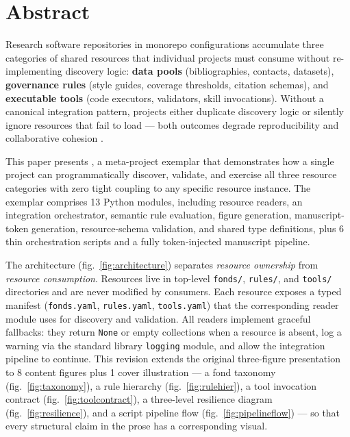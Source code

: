 \documentclass[
]{article}
\begin{document}
\newpage

\section{Abstract}\label{abstract}

Research software repositories in monorepo configurations accumulate
three categories of shared resources that individual projects must
consume without re-implementing discovery logic: \textbf{data pools}
(bibliographies, contacts, datasets), \textbf{governance rules} (style
guides, coverage thresholds, citation schemas), and \textbf{executable
tools} (code executors, validators, skill invocations). Without a
canonical integration pattern, projects either duplicate discovery logic
or silently ignore resources that fail to load --- both outcomes degrade
reproducibility and collaborative cohesion
\citep{Wilson2014best, Taschuk2017ten}.

This paper presents , a
meta-project exemplar that demonstrates how a single project can
programmatically discover, validate, and exercise all three resource
categories with zero tight coupling to any specific resource instance.
The exemplar comprises 13 Python modules, including resource readers, an
integration orchestrator, semantic rule evaluation, figure generation,
manuscript-token generation, resource-schema validation, and shared type
definitions, plus 6 thin orchestration scripts and a fully
token-injected manuscript pipeline.

The architecture (fig.~\ref{fig:architecture}) separates \emph{resource
ownership} from \emph{resource consumption}. Resources live in top-level
\texttt{fonds/}, \texttt{rules/}, and \texttt{tools/} directories and
are never modified by consumers. Each resource exposes a typed manifest
(\texttt{fonds.yaml}, \texttt{rules.yaml}, \texttt{tools.yaml}) that the
corresponding reader module uses for discovery and validation. All
readers implement graceful fallbacks: they return \texttt{None} or empty
collections when a resource is absent, log a warning via the standard
library \texttt{logging} module, and allow the integration pipeline to
continue. This revision extends the original three-figure presentation
to 8 content figures plus 1 cover illustration --- a fond taxonomy
(fig.~\ref{fig:taxonomy}), a rule hierarchy (fig.~\ref{fig:rulehier}), a
tool invocation contract (fig.~\ref{fig:toolcontract}), a three-level
resilience diagram (fig.~\ref{fig:resilience}), and a script pipeline
flow (fig.~\ref{fig:pipelineflow}) --- so that every structural claim in
the prose has a corresponding visual.
\end{document}
